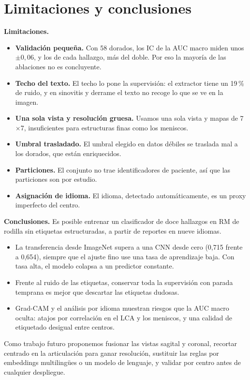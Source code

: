 \section{Limitaciones y conclusiones}
\label{sec:conclusiones}

\textbf{Limitaciones.}
\begin{itemize}
  \item \textbf{Validación pequeña.} Con 58 dorados, los IC de la AUC macro miden unos
        $\pm0{,}06$, y los de cada hallazgo, más del doble. Por eso la mayoría de las
        ablaciones no es concluyente.
  \item \textbf{Techo del texto.} El techo lo pone la supervisión: el extractor tiene un 19\,\%
        de ruido, y en sinovitis y derrame el texto no recoge lo que se ve en la imagen.
  \item \textbf{Una sola vista y resolución gruesa.} Usamos una sola vista y mapas de
        7$\times$7, insuficientes para estructuras finas como los meniscos.
  \item \textbf{Umbral trasladado.} El umbral elegido en datos débiles se traslada mal a los
        dorados, que están enriquecidos.
  \item \textbf{Particiones.} El conjunto no trae identificadores de paciente, así que las
        particiones son por estudio.
  \item \textbf{Asignación de idioma.} El idioma, detectado automáticamente, es un proxy
        imperfecto del centro.
\end{itemize}

\textbf{Conclusiones.} Es posible entrenar un clasificador de doce hallazgos en RM de rodilla
sin etiquetas estructuradas, a partir de reportes en nueve idiomas.
\begin{itemize}
  \item La transferencia desde ImageNet supera a una CNN desde cero (0,715 frente a 0,654),
        siempre que el ajuste fino use una tasa de aprendizaje baja. Con tasa alta, el modelo
        colapsa a un predictor constante.
  \item Frente al ruido de las etiquetas, conservar toda la supervisión con parada temprana
        es mejor que descartar las etiquetas dudosas.
  \item Grad-CAM y el análisis por idioma muestran riesgos que la AUC macro oculta: atajos
        por correlación en el LCA y los meniscos, y una calidad de etiquetado desigual entre
        centros.
\end{itemize}
Como trabajo futuro proponemos fusionar las vistas sagital y coronal, recortar centrado en la
articulación para ganar resolución, sustituir las reglas por embeddings multilingües o un
modelo de lenguaje, y validar por centro antes de cualquier despliegue.
